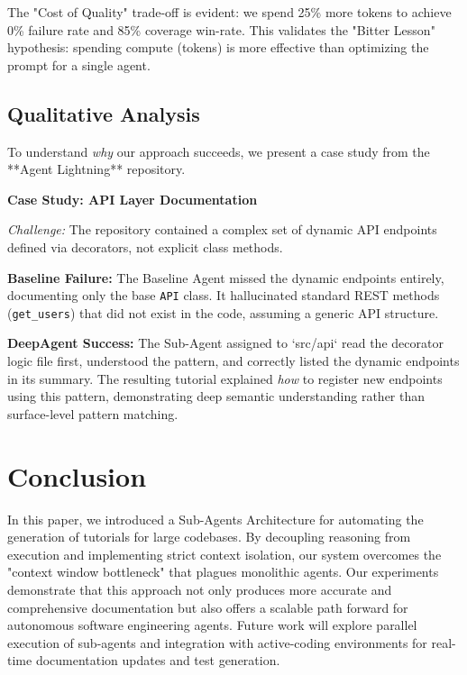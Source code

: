\documentclass[conference]{IEEEtran}
\begin{document}
The "Cost of Quality" trade-off is evident: we spend 25\% more tokens to achieve 0\% failure rate and 85\% coverage win-rate. This validates the "Bitter Lesson" hypothesis: spending compute (tokens) is more effective than optimizing the prompt for a single agent.

\subsection{Qualitative Analysis}
To understand \textit{why} our approach succeeds, we present a case study from the **Agent Lightning** repository.

\noindent\textbf{Case Study: API Layer Documentation}

\noindent\textit{Challenge:} The repository contained a complex set of dynamic API endpoints defined via decorators, not explicit class methods.

\noindent\textbf{Baseline Failure:}
The Baseline Agent missed the dynamic endpoints entirely, documenting only the base \texttt{API} class. It hallucinated standard REST methods (\texttt{get\_users}) that did not exist in the code, assuming a generic API structure.

\noindent\textbf{DeepAgent Success:}
The Sub-Agent assigned to `src/api` read the decorator logic file first, understood the pattern, and correctly listed the dynamic endpoints in its summary. The resulting tutorial explained \textit{how} to register new endpoints using this pattern, demonstrating deep semantic understanding rather than surface-level pattern matching.

\section{Conclusion}
In this paper, we introduced a Sub-Agents Architecture for automating the generation of tutorials for large codebases. By decoupling reasoning from execution and implementing strict context isolation, our system overcomes the "context window bottleneck" that plagues monolithic agents. Our experiments demonstrate that this approach not only produces more accurate and comprehensive documentation but also offers a scalable path forward for autonomous software engineering agents. Future work will explore parallel execution of sub-agents and integration with active-coding environments for real-time documentation updates and test generation.
\end{document}
